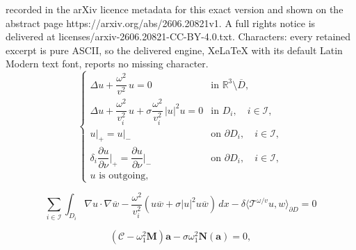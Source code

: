 \documentclass[10pt,a4paper]{amsart}
\begin{document}
recorded in the arXiv licence metadata for this exact version and shown on the abstract page https://arxiv.org/abs/2606.20821v1. A full rights notice is delivered at licenses/arxiv-2606.20821-CC-BY-4.0.txt. Characters: every retained excerpt is pure ASCII, so the delivered engine, XeLaTeX with its default Latin Modern text font, reports no missing character.
\begin{equation}\label{eq:nonlinear_problem}
    \begin{cases}
        \Delta u + \dfrac{\omega^2}{v^2}\, u = 0
        & \text{in } \mathbb{R}^3 \setminus \overline{D}, \\[0.8em]
        \Delta u + \dfrac{\omega^2}{v_i^2}\, u
        + \sigma \dfrac{\omega^2}{v_i^2}\, |u|^2 u = 0
        & \text{in } D_i, \quad i \in \mathcal{I}, \\[0.8em]
        u\big|_+ = u\big|_-
        & \text{on } \partial D_i, \quad i \in \mathcal{I}, \\[0.8em]
        \delta_i \dfrac{\partial u}{\partial \nu}\bigg|_+
        = \dfrac{\partial u}{\partial \nu}\bigg|_-
        & \text{on } \partial D_i, \quad i \in \mathcal{I}, \\[0.8em]
        u \text{ is outgoing,}
    \end{cases}
\end{equation}

\begin{equation}\label{eq:weak_formulation}
    \sum_{i\in \mathcal{I}}\int_{D_i}\nabla u \cdot\nabla \overline{w} - \frac{\omega^2}{v_i^2}\left(u\overline{w} + \sigma \lvert u\rvert^2 u \overline{w}\right)\,dx - \delta \langle \mathcal{T}^{\omega/v} u, w\rangle_{\partial D} = 0
\end{equation}

\begin{equation}\label{eq:discrete_nonlinear}
        (\mathcal{C} - \omega_1^2 \mathbf{M})\mathbf{a} - \sigma \omega_1^2 \mathbf{N}(\mathbf{a}) = 0,
\end{equation}
\end{document}

